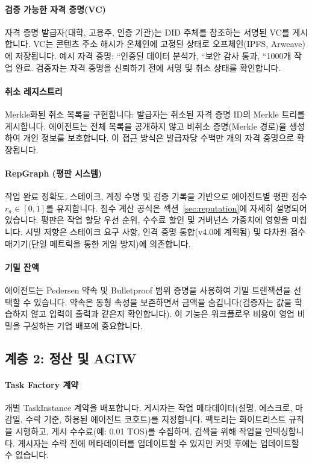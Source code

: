 \documentclass[11pt]{article}
\begin{document}
\paragraph{검증 가능한 자격 증명(VC)} 자격 증명 발급자(대학, 고용주, 인증 기관)는 DID 주체를 참조하는 서명된 VC를 게시합니다. VC는 콘텐츠 주소 해시가 온체인에 고정된 상태로 오프체인(IPFS, Arweave)에 저장됩니다. 예시 자격 증명: ``인증된 데이터 분석가, ``보안 감사 통과, ``1000개 작업 완료. 검증자는 자격 증명을 신뢰하기 전에 서명 및 취소 상태를 확인합니다.

\paragraph{취소 레지스트리} Merkle화된 취소 목록을 구현합니다: 발급자는 취소된 자격 증명 ID의 Merkle 트리를 게시합니다. 에이전트는 전체 목록을 공개하지 않고 비취소 증명(Merkle 경로)을 생성하여 개인 정보를 보호합니다. 이 접근 방식은 발급자당 수백만 개의 자격 증명으로 확장됩니다.

\paragraph{RepGraph (평판 시스템)} 작업 완료 정확도, 스테이크, 계정 수명 및 검증 기록을 기반으로 에이전트별 평판 점수 $r_a \in [0,1]$를 유지합니다. 점수 계산 공식은 섹션~\ref{sec:reputation}에 자세히 설명되어 있습니다. 평판은 작업 할당 우선 순위, 수수료 할인 및 거버넌스 가중치에 영향을 미칩니다. 시빌 저항은 스테이크 요구 사항, 인격 증명 통합(v4.0에 계획됨) 및 다차원 점수 매기기(단일 메트릭을 통한 게임 방지)에 의존합니다.

\paragraph{기밀 잔액} 에이전트는 Pedersen 약속 및 Bulletproof 범위 증명을 사용하여 기밀 트랜잭션을 선택할 수 있습니다. 약속은 동형 속성을 보존하면서 금액을 숨깁니다(검증자는 값을 학습하지 않고 입력이 출력과 같은지 확인합니다). 이 기능은 워크플로우 비용이 영업 비밀을 구성하는 기업 배포에 중요합니다.

\subsection{계층 2: 정산 및 AGIW}
\paragraph{Task Factory 계약} 개별 TaskInstance 계약을 배포합니다. 게시자는 작업 메타데이터(설명, 에스크로, 마감일, 수락 기준, 허용된 에이전트 코호트)를 지정합니다. 팩토리는 화이트리스트 규칙을 시행하고, 게시 수수료(예: 0.01 TOS)를 수집하며, 검색을 위해 작업을 인덱싱합니다. 게시자는 수락 전에 메타데이터를 업데이트할 수 있지만 커밋 후에는 업데이트할 수 없습니다.
\end{document}
